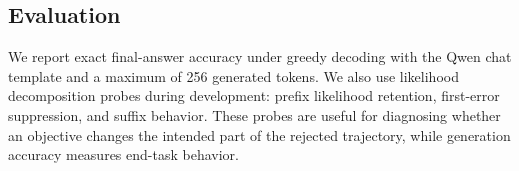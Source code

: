 \subsection{Evaluation}

We report exact final-answer accuracy under greedy decoding with the Qwen chat template and a maximum of 256 generated tokens. We also use likelihood decomposition probes during development: prefix likelihood retention, first-error suppression, and suffix behavior. These probes are useful for diagnosing whether an objective changes the intended part of the rejected trajectory, while generation accuracy measures end-task behavior.
